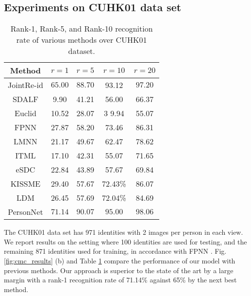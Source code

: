 \documentclass[10pt,journal,twocolumn]{IEEEtran}
\begin{document}
\subsection{Experiments on CUHK01 data set}\begin{table}[t]
  \centering
  \caption{Rank-1, Rank-5, and Rank-10 recognition rate of various methods over CUHK01 dataset. }  \label{tab:cmc_cuhk01}{
  \begin{tabular}{c|c|c|c|c}
  \hline
\hline
    Method  & $r=1$  & $ r=5 $& $r=10 $ & $r=20$ \\
  \hline\hline
   JointRe-id \cite{JointRe-id}  & $65.00$ & $88.70$ &93.12 & $97.20$ \\
   SDALF \cite{Farenzena2010Person} & 9.90 & 41.21 & 56.00 & 66.37 \\
   Euclid  & 10.52 & 28.07 &3 9.94 & 55.07 \\
   FPNN \cite{FPNN} & 27.87 & 58.20 & 73.46 & 86.31 \\
   LMNN \cite{Hirzer2012Person} & 21.17 & 49.67 & 62.47 & 78.62 \\
   ITML \cite{Davis2007Information} & 17.10 & 42.31 & 55.07 & 71.65 \\
   eSDC \cite{Zhao2013Unsupervised} & 22.84 & 43.89 & 57.67 & 69.84 \\
   KISSME \cite{Kostinger2012Large}  & 29.40 & 57.67 &72.43\% & 86.07 \\
   LDM\cite{Guillaumin2009Isthatyou}  & 26.45 & 57.69 &72.04\% & 84.69 \\
\hline
   PersonNet   &  $\mathbf{71.14}$ &  $\mathbf{90.07}$ & $\mathbf{95.00}$ &  $\mathbf{98.06}$ \\
  \hline
  \end{tabular}
  }
\end{table}

The CUHK01 data set has 971 identities with 2 images per person in each view. We report results on the setting where 100 identities are used for testing, and the remaining 871 identities used for training, in accordance with FPNN \cite{FPNN}. Fig. \ref{fig:cmc_results} (b) and Table \ref{tab:cmc_cuhk01} compare the performance of our model with previous methods.
Our approach is superior to the state of the art by a large margin with a rank-1 recognition rate of 71.14\% against 65\% by the next best method.
\end{document}
